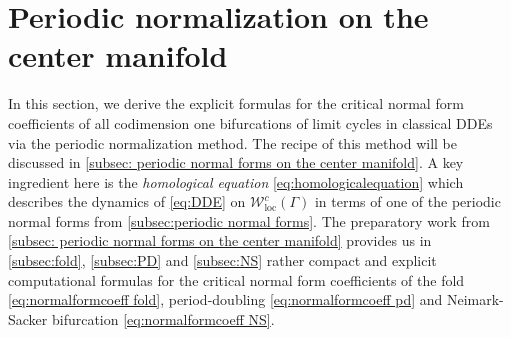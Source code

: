 \documentclass[english]{myarticle}
\DeclareMathOperator{\loc}{loc}
\begin{document}
\begin{sloppypar}
\begin{remark}
\end{remark}

\section{Periodic normalization on the center manifold} \label{sec:periodic normalization}
In this section, we derive the explicit formulas for the critical normal form coefficients of all codimension one bifurcations of limit cycles in classical DDEs via the periodic normalization method. The recipe of this method will be discussed in \cref{subsec: periodic normal forms on the center manifold}. A key ingredient here is the \emph{homological equation} \eqref{eq:homologicalequation} which describes the dynamics of \eqref{eq:DDE} on $\mathcal{W}_{\loc}^c(\Gamma)$ in terms of one of the periodic normal forms from \cref{subsec:periodic normal forms}. The preparatory work from \cref{subsec: periodic normal forms on the center manifold} provides us in \cref{subsec:fold}, \cref{subsec:PD} and \cref{subsec:NS} rather compact and explicit computational formulas for the critical normal form coefficients of the fold \eqref{eq:normalformcoeff fold}, period-doubling \eqref{eq:normalformcoeff pd} and Neimark-Sacker bifurcation \eqref{eq:normalformcoeff NS}.


\end{sloppypar}
\end{document}

